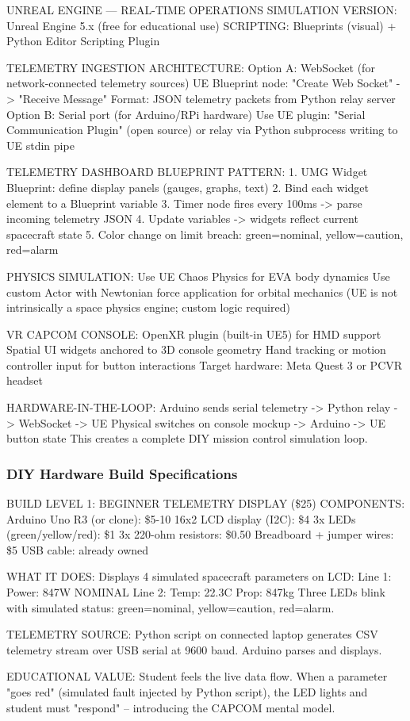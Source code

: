 \documentclass[11pt,letterpaper]{article}
\begin{document}
\begin{simplatbox}{UNREAL ENGINE --- REAL-TIME OPERATIONS SIMULATION}
VERSION: Unreal Engine 5.x (free for educational use)
SCRIPTING: Blueprints (visual) + Python Editor Scripting Plugin

TELEMETRY INGESTION ARCHITECTURE:
  Option A: WebSocket (for network-connected telemetry sources)
    UE Blueprint node: "Create Web Socket" -> "Receive Message"
    Format: JSON telemetry packets from Python relay server
  Option B: Serial port (for Arduino/RPi hardware)
    Use UE plugin: "Serial Communication Plugin" (open source)
    or relay via Python subprocess writing to UE stdin pipe

TELEMETRY DASHBOARD BLUEPRINT PATTERN:
  1. UMG Widget Blueprint: define display panels (gauges, graphs, text)
  2. Bind each widget element to a Blueprint variable
  3. Timer node fires every 100ms -> parse incoming telemetry JSON
  4. Update variables -> widgets reflect current spacecraft state
  5. Color change on limit breach: green=nominal, yellow=caution, red=alarm

PHYSICS SIMULATION:
  Use UE Chaos Physics for EVA body dynamics
  Use custom Actor with Newtonian force application for orbital mechanics
  (UE is not intrinsically a space physics engine; custom logic required)

VR CAPCOM CONSOLE:
  OpenXR plugin (built-in UE5) for HMD support
  Spatial UI widgets anchored to 3D console geometry
  Hand tracking or motion controller input for button interactions
  Target hardware: Meta Quest 3 or PCVR headset

HARDWARE-IN-THE-LOOP:
  Arduino sends serial telemetry -> Python relay -> WebSocket -> UE
  Physical switches on console mockup -> Arduino -> UE button state
  This creates a complete DIY mission control simulation loop.
\end{simplatbox}

\subsubsection{DIY Hardware Build Specifications}

\begin{hwbox}{BUILD LEVEL 1: BEGINNER TELEMETRY DISPLAY (\$25)}
COMPONENTS:
  Arduino Uno R3 (or clone): \$5-10
  16x2 LCD display (I2C): \$4
  3x LEDs (green/yellow/red): \$1
  3x 220-ohm resistors: \$0.50
  Breadboard + jumper wires: \$5
  USB cable: already owned

WHAT IT DOES:
  Displays 4 simulated spacecraft parameters on LCD:
  Line 1: Power: 847W  NOMINAL
  Line 2: Temp: 22.3C  Prop: 847kg
  Three LEDs blink with simulated status: green=nominal,
  yellow=caution, red=alarm.

TELEMETRY SOURCE:
  Python script on connected laptop generates CSV telemetry stream
  over USB serial at 9600 baud. Arduino parses and displays.

EDUCATIONAL VALUE:
  Student feels the live data flow. When a parameter "goes red"
  (simulated fault injected by Python script), the LED lights
  and student must "respond" -- introducing the CAPCOM mental model.
\end{hwbox}
\end{document}
